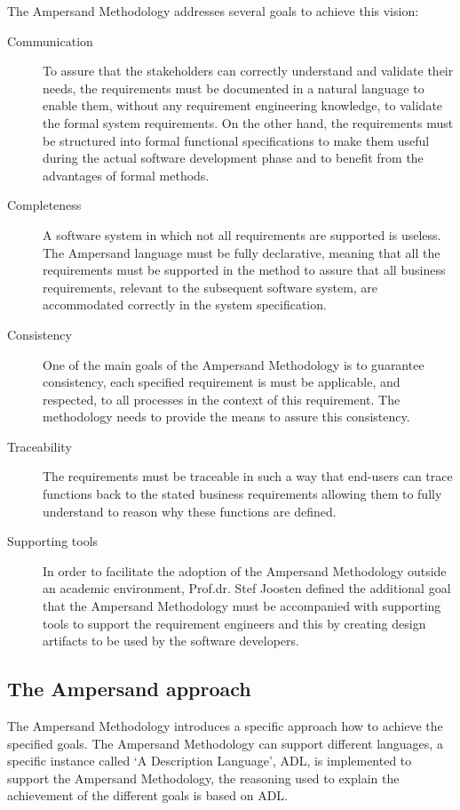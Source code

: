 The Ampersand Methodology addresses several goals to achieve this vision:
\begin{description}
	\item[Communication]  To assure that the stakeholders can correctly understand and validate their needs, the requirements must be documented in a natural language to enable them, without any requirement engineering knowledge, to validate the formal system requirements. On the other hand, the requirements must be structured into formal  functional specifications to make them useful during the actual software development phase and to benefit from the advantages of formal methods. 
	\item[Completeness]A software system in which not all requirements are supported is useless. The Ampersand language must be fully declarative, meaning that all the requirements must be supported in the method to assure that all business requirements, relevant to the subsequent software system, are accommodated correctly in the system specification.
	\item[Consistency]One of the main goals of the Ampersand Methodology is to guarantee consistency, each specified requirement is must be applicable, and respected, to all processes in the context of this requirement. The methodology needs to provide the means to assure this consistency.
	\item[Traceability] The requirements must be traceable in such a way that end-users can trace  functions back to the stated business requirements allowing them to fully understand to reason why these functions are defined.
	\item[Supporting tools] In order to facilitate the adoption of the Ampersand Methodology outside an academic environment, Prof.dr. Stef Joosten defined the additional goal that the Ampersand Methodology must be accompanied with supporting tools to support the requirement engineers and this by creating design artifacts to be used by the software developers.
\end{description}

\subsection{The Ampersand approach}
The Ampersand Methodology introduces a specific approach how to achieve the specified goals. The Ampersand Methodology can support different languages, a specific instance called `A Description Language', ADL, is implemented to support the Ampersand Methodology, the reasoning used to explain the achievement of the different goals is based on ADL.

